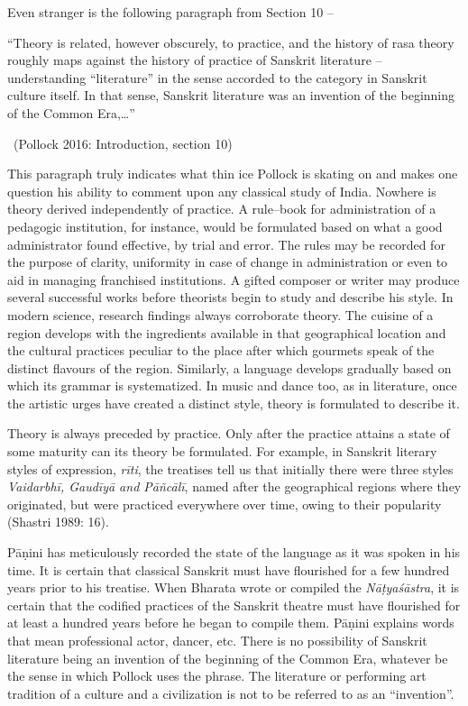 Even stranger is the following paragraph from Section 10 –

\begin{myquote}
“Theory is related, however obscurely, to practice, and the history of rasa theory roughly maps against the history of practice of Sanskrit literature – understanding “literature” in the sense accorded to the category in Sanskrit culture itself. In that sense, Sanskrit literature was an invention of the beginning of the Common Era,…” 

~\hfill (Pollock 2016: Introduction, section 10)
\end{myquote}

This paragraph truly indicates what thin ice Pollock is skating on and makes one question his ability to comment upon any classical study of India. Nowhere is theory derived independently of practice. A rule–book for administration of a pedagogic institution, for instance, would be formulated based on what a good administrator found effective, by trial and error. The rules may be recorded for the purpose of clarity, uniformity in case of change in administration or even to aid in managing franchised institutions. A gifted composer or writer may produce several successful works before theorists begin to study and describe his style. In modern science, research findings always corroborate theory. The cuisine of a region develops with the ingredients available in that geographical location and the cultural practices peculiar to the place after which gourmets speak of the distinct flavours of the region. Similarly, a language develops gradually based on which its grammar is systematized. In music and dance too, as in literature, once the artistic urges have created a distinct style, theory is formulated to describe it.

Theory is always preceded by practice. Only after the practice attains a state of some maturity can its theory be formulated. For example, in Sanskrit literary styles of expression, \textit{rīti}, the treatises tell us that initially there were three styles \textit{Vaidarbhī, Gaudīyā and Pāñcālī}, named after the geographical regions where they originated, but were practiced everywhere over time, owing to their popularity (Shastri 1989: 16).

Pāṇini has meticulously recorded the state of the language as it was spoken in his time. It is certain that classical Sanskrit must have flourished for a few hundred years prior to his treatise. When Bharata wrote or compiled the \textit{Nāṭyaśāstra}, it is certain that the codified practices of the Sanskrit theatre must have flourished for at least a hundred years before he began to compile them. Pāṇini explains words that mean professional actor, dancer, etc. There is no possibility of Sanskrit literature being an invention of the beginning of the Common Era, whatever be the sense in which Pollock uses the phrase. The literature or performing art tradition of a culture and a civilization is not to be referred to as an “invention”.



